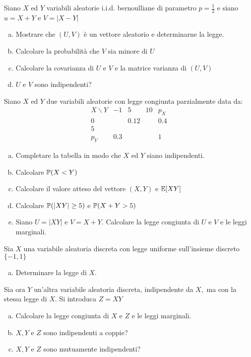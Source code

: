 \Esercizio{}

Siano $X$ ed $Y$ variabili aleatorie i.i.d. bernoulliane di parametro $p=\frac{1}{2}$ e siano $u=X+Y$ e $V=|X-Y|$
\begin{enumerate}[a)]
	\item Mostrare che $(U,V)$ è un vettore aleatorio e determinarne la legge.
	\item Calcolare la probabilità che $V$ sia minore di $U$
	\item Calcolare la covarianza di $U$ e $V$ e la matrice varianza di $(U,V)$
	\item $U$ e $V$ sono indipendenti?
\end{enumerate}

\Esercizio{}

Siano $X$ ed $Y$ due variabili aleatorie con legge congiunta parzialmente data da:
\begin{equation*}
	\begin{array}{ c|c|c|c|c }
		X\backslash Y & -1 & 5 & 10 & p_{X}\\
		\hline
		0 &  & 0.12 &  & 0.4\\
		\hline
		5 &  &  &  & \\
		\hline
		p_{Y} & 0.3 &  &  & 1
	\end{array}
\end{equation*}
\begin{enumerate}[a)]
	\item Completare la tabella in modo che $X$ ed $Y$ siano indipendenti.
	\item Calcolare $\mathbb{P} (X< Y)$
	\item Calcolare il valore atteso del vettore $(X,Y)$ e $\mathbb{E}[XY]$
	\item Calcolare $\mathbb{P} (|XY|\geq 5)$ e $\mathbb{P} (X+Y >5)$
	\item Siano $U=|XY|$ e $V=X+Y$. Calcolare la legge congiunta di $U$ e $V$ e le leggi marginali.
\end{enumerate}

\Esercizio{}

Sia $X$ una variabile aleatoria discreta con legge uniforme sull'insieme discreto $\{-1,1\}$

\begin{enumerate}[a)]
	\item Determinare la legge di $X$.
\end{enumerate}
Sia ora $Y$ un'altra variabile aleatoria discreta, indipendente da $X,$ ma con la stessa legge di $X$. Si introduca $Z=XY$
\begin{enumerate}[a),resume]
	\item Calcolare la legge congiunta di $X$ e $Z$ e le leggi marginali.
	\item $X,Y$ e $Z$ sono indipendenti a coppie?
	\item $X,Y$ e $Z$ sono mutuamente indipendenti?
\end{enumerate}

